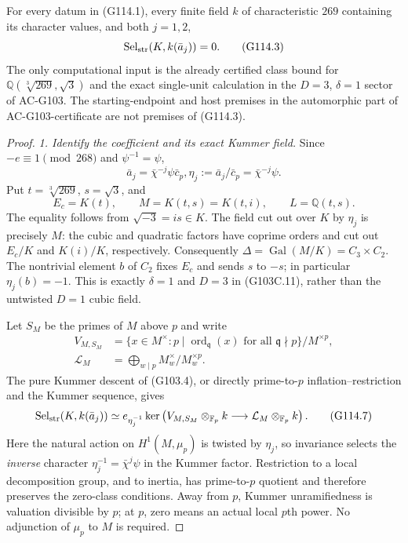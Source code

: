 \begin{theorem}
\label{thm:ACG114residual}
For every datum in (G114.1), every finite field $k$ of characteristic
$269$ containing its character values, and both $j=1,2$,
\[
          \operatorname{Sel}_{\rm str}(K,k(\bar a_j))=0.
 \tag{G114.3}
\]
The only computational input is the already certified class bound
for $\mathbb Q(\sqrt[3]{269},\sqrt3)$ and the exact single-unit
calculation in the $D=3$, $\delta=1$ sector of AC-G103.
The starting-endpoint and host premises in the automorphic part of
AC-G103-certificate are not premises of (G114.3).
\end{theorem}

\begin{proof}
\emph{1. Identify the coefficient and its exact Kummer field.}
Since $-e\equiv1\pmod{268}$ and $\psi^{-1}=\psi$,
\[
       \bar a_j=\bar\chi^{-j}\psi\bar c_p,
       \eta_j:=\bar a_j/\bar c_p=\bar\chi^{-j}\psi.
 \tag{G114.4}
\]
Put $t=\sqrt[3]{269}$, $s=\sqrt3$, and
\[
 E_c=K(t),\qquad M=K(t,s)=K(t,i),\qquad L=\mathbb Q(t,s).
 \tag{G114.5}
\]
The equality follows from $\sqrt{-3}=is\in K$.
The field cut out over $K$ by $\eta_j$ is precisely $M$:
the cubic and quadratic factors have coprime orders and cut out
$E_c/K$ and $K(i)/K$, respectively.
Consequently $\Delta=\operatorname{Gal}(M/K)=C_3\times C_2$.
The nontrivial element $b$ of $C_2$ fixes $E_c$ and sends $s$ to
$-s$; in particular $\eta_j(b)=-1$.
This is exactly $\delta=1$ and $D=3$ in (G103C.11), rather than
the untwisted $D=1$ cubic field.

Let $S_M$ be the primes of $M$ above $p$ and write
\[
 \begin{split}
 V_{M,S_M}&=\{x\in M^\times:
      p\mid\operatorname{ord}_{\mathfrak q}(x)
                   \text{ for all }\mathfrak q\nmid p\}/M^{\times p},\\
 \mathcal L_M&=\bigoplus_{w\mid p}M_w^\times/M_w^{\times p}.
 \end{split}
 \tag{G114.6}
\]
The pure Kummer descent of (G103.4), or directly prime-to-$p$
inflation--restriction and the Kummer sequence, gives
\[
 \operatorname{Sel}_{\rm str}(K,k(\bar a_j))
  \simeq e_{\eta_j^{-1}}\ker\left(
       V_{M,S_M}\otimes_{\mathbb F_p}k
            \longrightarrow\mathcal L_M\otimes_{\mathbb F_p}k\right).
 \tag{G114.7}
\]
Here the natural action on $H^1(M,\mu_p)$ is twisted by $\eta_j$,
so invariance selects the \emph{inverse} character
$\eta_j^{-1}=\bar\chi^j\psi$ in the Kummer factor.
Restriction to a local decomposition group, and to inertia, has
prime-to-$p$ quotient and therefore preserves the zero-class
conditions.  Away from $p$, Kummer unramifiedness is valuation
divisible by $p$; at $p$, zero means an actual local $p$th power.
No adjunction of $\mu_p$ to $M$ is required.


\end{proof}
